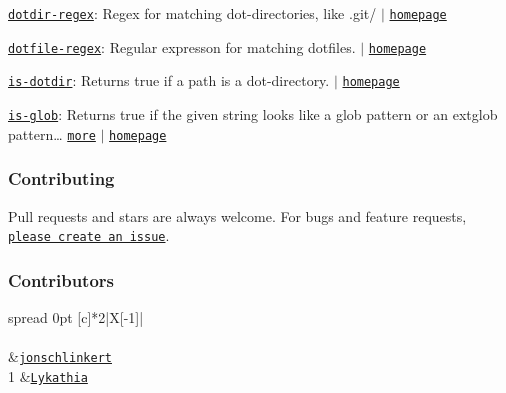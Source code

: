 \begin{DoxyItemize}
\item \href{https://www.npmjs.com/package/dotdir-regex}{\tt dotdir-\/regex}\+: Regex for matching dot-\/directories, like {\ttfamily .git/} $\vert$ \href{https://github.com/regexps/dotdir-regex}{\tt homepage}
\item \href{https://www.npmjs.com/package/dotfile-regex}{\tt dotfile-\/regex}\+: Regular expresson for matching dotfiles. $\vert$ \href{https://github.com/regexps/dotfile-regex}{\tt homepage}
\item \href{https://www.npmjs.com/package/is-dotdir}{\tt is-\/dotdir}\+: Returns true if a path is a dot-\/directory. $\vert$ \href{https://github.com/jonschlinkert/is-dotdir}{\tt homepage}
\item \href{https://www.npmjs.com/package/is-glob}{\tt is-\/glob}\+: Returns {\ttfamily true} if the given string looks like a glob pattern or an extglob pattern… \href{https://github.com/jonschlinkert/is-glob}{\tt more} $\vert$ \href{https://github.com/jonschlinkert/is-glob}{\tt homepage}
\end{DoxyItemize}

\subsubsection*{Contributing}

Pull requests and stars are always welcome. For bugs and feature requests, \href{../../issues/new}{\tt please create an issue}.

\subsubsection*{Contributors}

\tabulinesep=1mm
\begin{longtabu} spread 0pt [c]{*{2}{|X[-1]}|}
\hline
\rowcolor{\tableheadbgcolor}\\
\endfirsthead
\hline
\endfoot
\hline
\rowcolor{\tableheadbgcolor}\\
  &\href{https://github.com/jonschlinkert}{\tt jonschlinkert}   \\
1  &\href{https://github.com/Lykathia}{\tt Lykathia}   \\
\end{longtabu}


